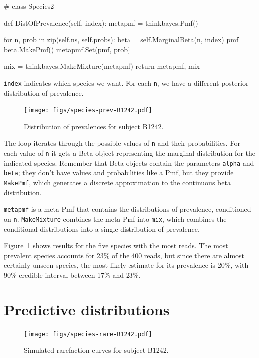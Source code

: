 \documentclass[12pt]{book}
\theoremstyle{exercise}
\begin{document}
\begin{code}
# class Species2

    def DistOfPrevalence(self, index):
        metapmf = thinkbayes.Pmf()

        for n, prob in zip(self.ns, self.probs):
            beta = self.MarginalBeta(n, index)
            pmf = beta.MakePmf()
            metapmf.Set(pmf, prob)

        mix = thinkbayes.MakeMixture(metapmf)
        return metapmf, mix
\end{code}

{\tt index} indicates which species we want.  For each
{\tt n}, we have a different posterior distribution
of prevalence.

\begin{figure}
\centerline{\texttt{[image: figs/species-prev-B1242.pdf]}}
\caption{Distribution of prevalences for subject B1242.}
\label{species-prev}
\end{figure}

The loop iterates through the possible values of {\tt n}
and their probabilities.  For each value of {\tt n} it gets
a Beta object representing the marginal distribution for the
indicated species.  Remember that Beta objects contain the
parameters {\tt alpha} and {\tt beta}; they don't have
values and probabilities like a Pmf, but they provide {\tt MakePmf},
which generates a discrete approximation to the continuous
beta distribution.

{\tt metapmf} is a meta-Pmf that contains the distributions
of prevalence, conditioned on {\tt n}.  {\tt MakeMixture}
combines the meta-Pmf into {\tt mix}, which combines the
conditional distributions into a single distribution
of prevalence.

Figure~\ref{species-prev} shows results for the five
species with the most reads.  The most prevalent species accounts for
23\% of the 400 reads, but since there are almost certainly unseen
species, the most likely estimate for its prevalence is 20\%,
with 90\% credible interval between 17\% and 23\%.


\section{Predictive distributions}

\begin{figure}
\centerline{\texttt{[image: figs/species-rare-B1242.pdf]}}
\caption{Simulated rarefaction curves for subject B1242.}
\label{species-rare}
\end{figure}
\end{document}
